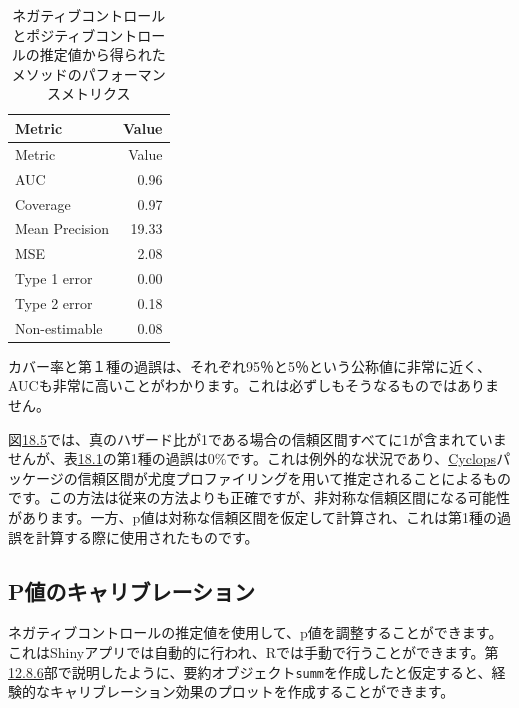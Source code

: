 \documentclass[
  11pt]{book}
\theoremstyle{definition}
\theoremstyle{definition}
\theoremstyle{definition}
\theoremstyle{definition}
\theoremstyle{remark}
\begin{document}
\begin{longtable}[]{@{}lr@{}}
\caption{\label{tab:exampleMetrics} ネガティブコントロールとポジティブコントロールの推定値から得られたメソッドのパフォーマンスメトリクス}\tabularnewline
\toprule\noalign{}
Metric & Value \\
\midrule\noalign{}
\endfirsthead
\toprule\noalign{}
Metric & Value \\
\midrule\noalign{}
\endhead
\bottomrule\noalign{}
\endlastfoot
AUC & 0.96 \\
Coverage & 0.97 \\
Mean Precision & 19.33 \\
MSE & 2.08 \\
Type 1 error & 0.00 \\
Type 2 error & 0.18 \\
Non-estimable & 0.08 \\
\end{longtable}

カバー率と第１種の過誤は、それぞれ95％と5％という公称値に非常に近く、AUCも非常に高いことがわかります。これは必ずしもそうなるものではありません。

図\href{https://ohdsi.github.io/TheBookOfOhdsi/MethodValidity.html\#fig:controls}{18.5}では、真のハザード比が1である場合の信頼区間すべてに1が含まれていませんが、表\href{https://ohdsi.github.io/TheBookOfOhdsi/MethodValidity.html\#tab:exampleMetrics}{18.1}の第1種の過誤は0\%です。これは例外的な状況であり、\href{https://ohdsi.github.io/Cyclops/}{Cyclops}パッケージの信頼区間が尤度プロファイリングを用いて推定されることによるものです。この方法は従来の方法よりも正確ですが、非対称な信頼区間になる可能性があります。一方、p値は対称な信頼区間を仮定して計算され、これは第1種の過誤を計算する際に使用されたものです。

\subsection{P値のキャリブレーション}\label{pux5024ux306eux30adux30e3ux30eaux30d6ux30ecux30fcux30b7ux30e7ux30f3-1}

ネガティブコントロールの推定値を使用して、p値を調整することができます。これはShinyアプリでは自動的に行われ、Rでは手動で行うことができます。第\href{https://ohdsi.github.io/TheBookOfOhdsi/PopulationLevelEstimation.html\#MultipleAnalyses}{12.8.6}部で説明したように、要約オブジェクト\texttt{summ}を作成したと仮定すると、経験的なキャリブレーション効果のプロットを作成することができます。
\end{document}
